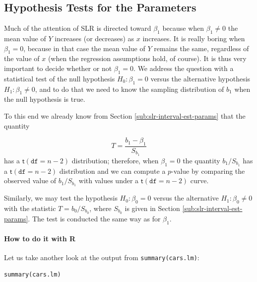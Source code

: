 \documentclass[captions=tableheading]{scrbook}
\begin{document}
\label{sec:Model-Utility-SLR}
\subsection{Hypothesis Tests for the Parameters}
\label{sec-11-3-1}

\label{sub:slr-hypoth-test-params}

Much of the attention of SLR is directed toward \(\beta_{1}\) because when \( \beta_{1}\neq 0 \) the mean value of \(Y\) increases (or decreases) as \(x\) increases. It is really boring when \(\beta_{1}=0\), because in that case the mean value of \(Y\) remains the same, regardless of the value of \(x\) (when the regression assumptions hold, of course). It is thus very important to decide whether or not \( \beta_{1} = 0 \). We address the question with a statistical test of the null hypothesis \(H_{0}:\beta_{1}=0\) versus the alternative hypothesis \(H_{1}:\beta_{1}\neq0\), and to do that we need to know the sampling distribution of \(b_{1}\) when the null hypothesis is true.

To this end we already know from Section \ref{sub:slr-interval-est-params} that the quantity

\begin{equation} 
T=\frac{b_{1}-\beta_{1}}{S_{b_{1}}}
\end{equation}
has a \(\mathsf{t}(\mathtt{df}=n-2)\) distribution; therefore, when \(\beta_{1}=0\) the quantity \(b_{1}/S_{b_{1}}\) has a \(\mathsf{t}(\mathtt{df}=n-2)\) distribution and we can compute a \(p\)-value by comparing the observed value of \(b_{1}/S{}_{b_{1}}\) with values under a \(\mathsf{t}(\mathtt{df}=n-2)\) curve. 

Similarly, we may test the hypothesis \(H_{0}:\beta_{0}=0\) versus the alternative \(H_{1}:\beta_{0}\neq0\) with the statistic \(T=b_{0}/S_{b_{0}}\), where \(S_{b_{0}}\) is given in Section \ref{sub:slr-interval-est-params}. The test is conducted the same way as for \(\beta_{1}\). 


\paragraph*{How to do it with \textsf{R}}

Let us take another look at the output from \texttt{summary(cars.lm)}:


\begin{verbatim}
summary(cars.lm)
\end{verbatim}
\end{document}
